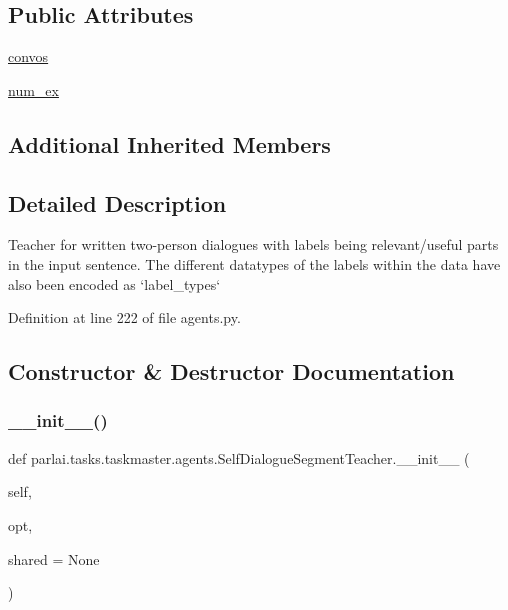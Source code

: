 \subsection*{Public Attributes}
\begin{DoxyCompactItemize}
\item 
\hyperlink{classparlai_1_1tasks_1_1taskmaster_1_1agents_1_1SelfDialogueSegmentTeacher_aced6b44c6ab5da0943ebd6f16acc5339}{convos}
\item 
\hyperlink{classparlai_1_1tasks_1_1taskmaster_1_1agents_1_1SelfDialogueSegmentTeacher_a231381551fe76fdbf333c0fd8c671b5e}{num\+\_\+ex}
\end{DoxyCompactItemize}
\subsection*{Additional Inherited Members}


\subsection{Detailed Description}
\begin{DoxyVerb}Teacher for written two-person dialogues with labels being relevant/useful
parts in the input sentence. The different datatypes of the labels within
the data have also been encoded as `label_types`
\end{DoxyVerb}
 

Definition at line 222 of file agents.\+py.



\subsection{Constructor \& Destructor Documentation}
\mbox{\label{classparlai_1_1tasks_1_1taskmaster_1_1agents_1_1SelfDialogueSegmentTeacher_a508d7db21bcb258cbeb1d89c5f33d6a3}} 
\subsubsection{\texorpdfstring{\+\_\+\+\_\+init\+\_\+\+\_\+()}{\_\_init\_\_()}}
{\footnotesize\ttfamily def parlai.\+tasks.\+taskmaster.\+agents.\+Self\+Dialogue\+Segment\+Teacher.\+\_\+\+\_\+init\+\_\+\+\_\+ (\begin{DoxyParamCaption}\item[{}]{self,  }\item[{}]{opt,  }\item[{}]{shared = {\ttfamily None} }\end{DoxyParamCaption})}



